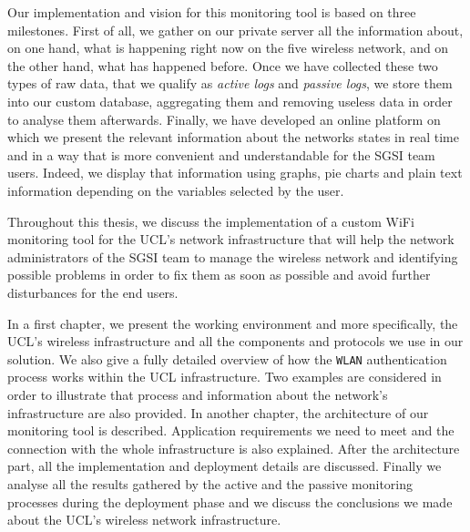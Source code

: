 Our implementation and vision for this monitoring tool is based on three milestones. First of all, we gather on our private server all the information about, on one hand, what is happening right now on the five wireless network, and on the other hand, what has happened before. Once we have collected these two types of raw data, that we qualify as \textit{active logs} and \textit{passive logs}, we store them into our custom database, aggregating them and removing useless data in order to analyse them afterwards. Finally, we have developed an online platform on which we present the relevant information about the networks states in real time and in a way that is more convenient and understandable for the SGSI team users. Indeed, we display that information using graphs, pie charts and plain text information depending on the variables selected by the user.

Throughout this thesis, we discuss the implementation of a custom WiFi monitoring tool for the UCL's network infrastructure that will help the network administrators of the SGSI team to manage the wireless network and identifying possible problems in order to fix them as soon as possible and avoid further disturbances for the end users. 


In a first chapter, we present the working environment and more specifically, the UCL's wireless infrastructure and all the components and protocols we use in our solution. We also give a fully detailed overview of how the \texttt{WLAN} authentication process works within the UCL infrastructure. Two examples are considered in order to illustrate that process and information about the network's infrastructure are also provided. In another chapter, the architecture of our monitoring tool is described. Application requirements we need to meet and the connection with the whole infrastructure is also explained. After the architecture part, all the implementation and deployment details are discussed. Finally we analyse all the results gathered by the active and the passive monitoring processes during the deployment phase and we discuss the conclusions we made about the UCL's wireless network infrastructure.





